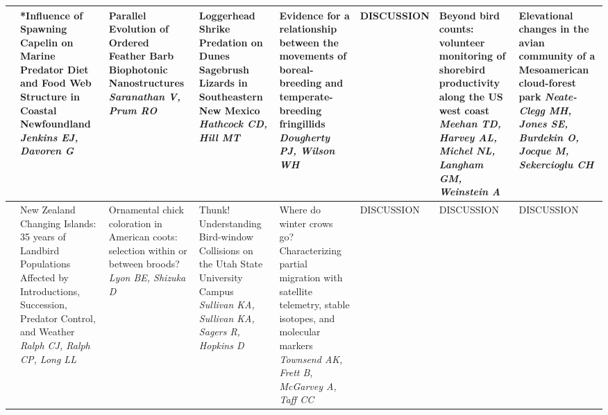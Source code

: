 \begin{tabular}{|x{0.85cm}|x{2.85cm}|x{2.85cm}|x{2.85cm}|x{2.85cm}|a{2.85cm}|a{2.85cm}|a{2.85cm}|}
&*Influence of Spawning Capelin on Marine Predator Diet and Food Web Structure in Coastal Newfoundland \newline \newline \textit{Jenkins EJ, Davoren G} & Parallel Evolution of Ordered Feather Barb Biophotonic Nanostructures \newline \newline \textit{Saranathan V, Prum RO} & Loggerhead Shrike Predation on Dunes Sagebrush Lizards in Southeastern New Mexico \newline \newline \textit{Hathcock CD, Hill MT} & Evidence for a relationship between the movements of boreal-breeding and temperate-breeding fringillids \newline \newline \textit{Dougherty PJ, Wilson WH} & DISCUSSION \newline \newline \textit{} & Beyond bird counts: volunteer monitoring of shorebird productivity along the US west coast \newline \newline \textit{Meehan TD, Harvey AL, Michel NL, Langham GM, Weinstein A} & Elevational changes in the avian community of a Mesoamerican cloud-forest park \newline \newline \textit{Neate-Clegg MH, Jones SE, Burdekin O, Jocque M, Sekercioglu CH}\\
\hline
{}&New Zealand Changing Islands: 35 years of Landbird Populations Affected by Introductions, Succession, Predator Control, and Weather \newline \newline \textit{Ralph CJ, Ralph CP, Long LL} & Ornamental chick coloration in American coots: selection within or between broods? \newline \newline \textit{Lyon BE, Shizuka D} & Thunk! Understanding Bird-window Collisions on the Utah State University Campus \newline \newline \textit{Sullivan KA, Sullivan KA, Sagers R, Hopkins D} & Where do winter crows go? Characterizing partial migration with satellite telemetry, stable isotopes, and molecular markers \newline \newline \textit{Townsend AK, Frett B, McGarvey A, Taff CC} & DISCUSSION \newline \newline \textit{} & DISCUSSION \newline \newline \textit{} & DISCUSSION \newline \newline \textit{}\\
\hline
\end{tabular}
